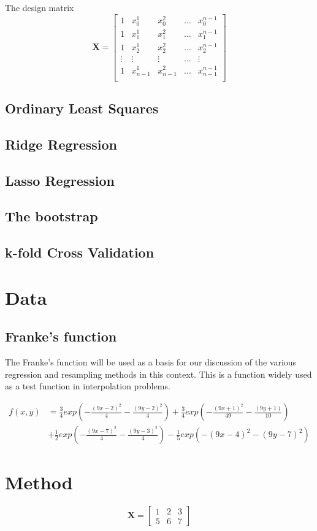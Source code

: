 \documentclass{article}
\begin{document}
The design matrix
\begin{equation}
\textbf{X} = 
\begin{bmatrix}
1 & x_{0}^{1} & x_{0}^{2} & \dots & x_{0}^{n-1} \\
1 & x_{1}^{1} & x_{1}^{2} & \dots & x_{1}^{n-1} \\
1 & x_{2}^{1} & x_{2}^{2} & \dots & x_{2}^{n-1} \\
\vdots & \vdots & \vdots & \dots & \vdots \\
1 & x_{n-1}^{1} & x_{n-1}^{2} & \dots & x_{n-1}^{n-1} \\ 
\end{bmatrix}
\end{equation}

\subsection{Ordinary Least Squares}

\subsection{Ridge Regression}
\subsection{Lasso Regression}
\subsection{The bootstrap}
\subsection{k-fold Cross Validation}

\section{Data}
\subsection{Franke's function}
The Franke's function will be used as a basis for our discussion of the various regression and resampling methods in this context. This is a function  widely used as a test function in interpolation problems.

\begin{align*}
f(x,y) &= \frac{3}{4}exp\left(-\frac{(9x-2)^2}{4} - \frac{(9y-2)^2}{4}\right)+\frac{3}{4}exp\left(-\frac{(9x+1)^2}{49} - \frac{(9y+1)}{10}\right)\\
&+ \frac{1}{2}exp\left(-\frac{(9x-7)^2}{4} - \frac{(9y-3)^2}{4}\right)-\frac{1}{5}exp\left(-(9x-4)^2 - (9y-7)^2\right)
\end{align*}
\section{Method}
$$\textbf{X} = \begin{bmatrix}
1 & 2 & 3 \\
5 & 6 & 7
\end{bmatrix}$$
\end{document}
